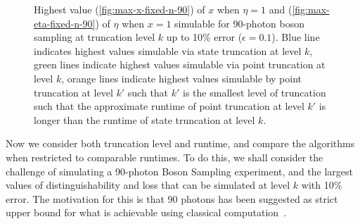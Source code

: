 \begin{figure}
\hfill
{}
\caption[Highest value of $x$ and $\eta=1$ simulable for 90-photon boson sampling at truncation level $k$]{\label{fig:fixed-n-90} 
Highest value (\ref{fig:max-x-fixed-n-90}) of $x$ when $\eta=1$ and (\ref{fig:max-eta-fixed-n-90}) of $\eta$ when $x=1$ simulable for 90-photon boson sampling at truncation level $k$ up to 10\% error ($\epsilon=0.1$). 
Blue line indicates highest values simulable via state truncation at level $k$, green lines indicate highest values simulable via point truncation at level $k$, orange lines indicate highest values simulable by point truncation at level $k'$ such that $k'$ is the smallest level of truncation such that the approximate runtime of point truncation at level $k'$ is longer than the runtime of state truncation at level $k$.}
\end{figure}

Now we consider both truncation level and runtime, and compare the algorithms when restricted to comparable runtimes. 
To do this, we shall consider the challenge of simulating a 90-photon Boson Sampling experiment, and the largest values of distinguishability and loss that can be simulated at level $k$ with 10\% error. 
The motivation for this is that $90$ photons has been suggested as strict upper bound for what is achievable using classical computation~\cite{dalzell2018}. 

